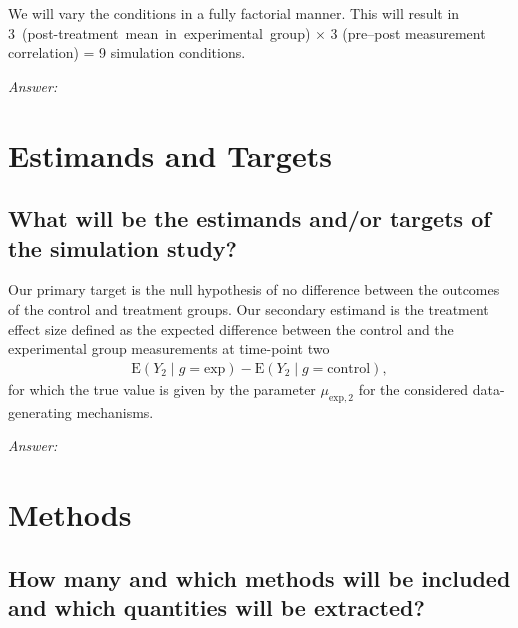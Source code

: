\documentclass[12pt]{article}
\begin{document}
\begin{examplebox}
We will vary the conditions in a fully factorial manner. This will result in\\ \mbox{3 (post-treatment mean in experimental group)} $\times$ 3 (pre--post measurement correlation) = 9 simulation conditions.
\end{examplebox}

\textit{Answer:}


\section{Estimands and Targets}
\subsection{What will be the estimands and/or targets of the simulation study?}


\begin{examplebox}
Our primary target is the null hypothesis of no difference between the outcomes of the control and treatment groups. Our secondary estimand is the treatment effect size defined as the expected difference between the control and the experimental group measurements at time-point two
\begin{align*}
    \text{E}(Y_2 \mid g=\text{exp}) - \text{E}(Y_2 \mid g=\text{control}),
\end{align*}
for which the true value is given by the parameter $\mu_{\text{exp},2}$ for the considered data-generating mechanisms.
\end{examplebox}

\textit{Answer:}

\section{Methods}
\subsection{How many and which methods will be included and which quantities will be extracted?}
\end{document}
